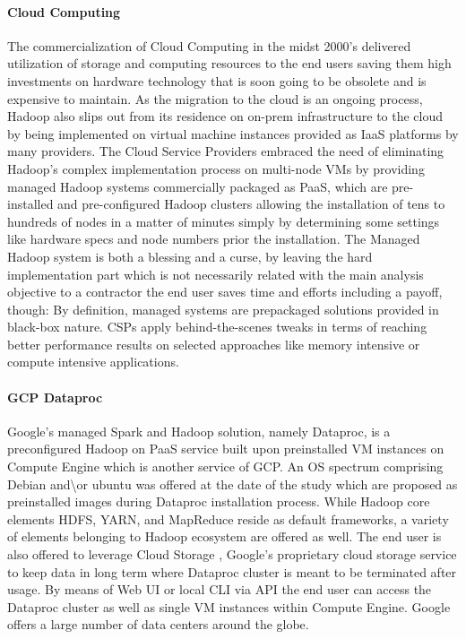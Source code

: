 \documentclass[review]{elsarticle}
\begin{document}
\paragraph{Cloud Computing}The commercialization of Cloud Computing in the midst 2000's \cite{noauthor_announcing_nodate} delivered utilization of storage and computing resources to the end users saving them high investments on hardware technology that is soon going to be obsolete and is expensive to maintain. As the migration to the cloud is an ongoing process, Hadoop also slips out from its residence on on-prem infrastructure to the cloud by being implemented on virtual machine instances provided as IaaS platforms by many providers. The Cloud Service Providers embraced the need of eliminating Hadoop's complex implementation process on multi-node VMs by providing managed Hadoop systems commercially packaged as PaaS, which are pre-installed and pre-configured Hadoop clusters allowing the installation of tens to hundreds of nodes in a matter of minutes simply by determining some settings like hardware specs and node numbers prior the installation. The Managed Hadoop system is both a blessing and a curse, by leaving the hard implementation part which is not necessarily related with the main analysis objective to a contractor the end user saves time and efforts including a payoff, though: By definition, managed systems are prepackaged solutions provided in black-box nature. CSPs apply behind-the-scenes tweaks in terms of reaching better performance results on selected approaches like memory intensive or compute intensive applications.

\paragraph{GCP Dataproc \cite{noauthor_dataproc_nodate}} Google's managed Spark and Hadoop solution, namely Dataproc, is a preconfigured Hadoop on PaaS service built upon preinstalled VM instances on Compute Engine \cite{noauthor_compute_nodate} which is another service of GCP. An OS spectrum comprising Debian and\textbackslash or ubuntu was offered at the date of the study which are proposed as preinstalled images during Dataproc installation process. While Hadoop core elements HDFS, YARN, and MapReduce reside as default frameworks, a variety of elements belonging to Hadoop ecosystem are offered as well. The end user is also offered to leverage Cloud Storage \cite{noauthor_cloud_nodate}, Google's proprietary cloud storage service to keep data in long term where Dataproc cluster is meant to be terminated after usage. By means of Web UI or local CLI via API the end user can access the Dataproc cluster as well as single VM instances within Compute Engine. Google offers a large number of data centers around the globe.
\end{document}
